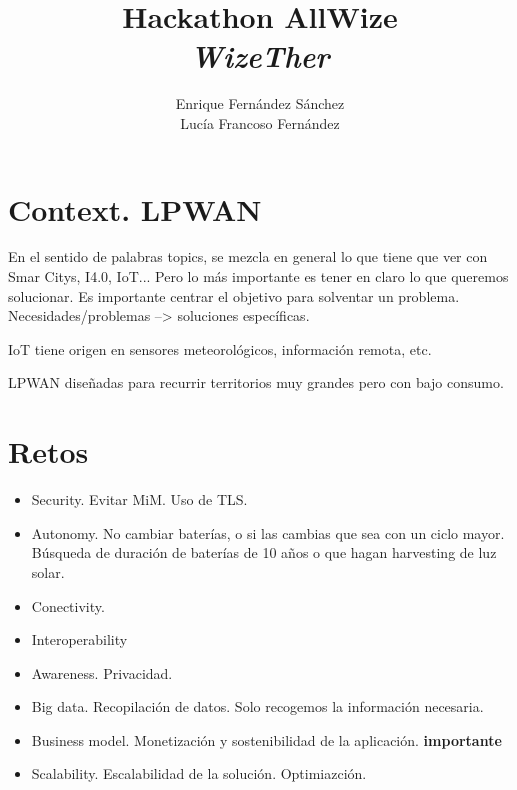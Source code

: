 \documentclass[12pt]{article}
\begin{document}
	
	
	\title{\huge Hackathon AllWize \\ \LARGE \textit{WizeTher}\\}
	\author{\small Enrique Fernández Sánchez \\ \small Lucía Francoso Fernández}

	
	
	\maketitle
	
	\pagebreak
	
	\tableofcontents
	
	\pagebreak
	
	\section{Context. LPWAN}
	\noindent En el sentido de palabras topics, se mezcla en general lo que tiene que ver con Smar Citys, I4.0, IoT... Pero lo más importante es tener en claro lo que queremos solucionar. Es importante centrar el objetivo para solventar un problema. Necesidades/problemas --> soluciones específicas.
	
	\noindent IoT tiene origen en sensores meteorológicos, información remota, etc.
	
	\noindent LPWAN diseñadas para recurrir territorios muy grandes pero con bajo consumo. 
	
	\section{Retos}
	\begin{itemize}
		\item Security. Evitar MiM. Uso de TLS. 
		\item Autonomy. No cambiar baterías, o si las cambias que sea con un ciclo mayor. Búsqueda de duración de baterías de 10 años o que hagan harvesting de luz solar.
		\item Conectivity.
		\item Interoperability
		\item Awareness. Privacidad.
		\item Big data. Recopilación de datos. Solo recogemos la información necesaria.
		\item Business model. Monetización y sostenibilidad de la aplicación. \textbf{importante}
		\item Scalability. Escalabilidad de la solución. Optimiazción.
	\end{itemize}
\end{document}
